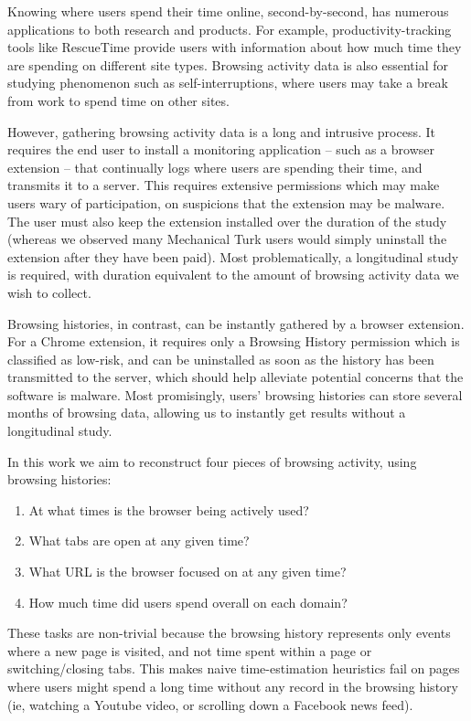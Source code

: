 \documentclass{sigchi}
\begin{document}
Knowing where users spend their time online, second-by-second, has numerous applications to both research and products. For example, productivity-tracking tools like RescueTime provide users with information about how much time they are spending on different site types. Browsing activity data is also essential for studying phenomenon such as self-interruptions, where users may take a break from work to spend time on other sites.

However, gathering browsing activity data is a long and intrusive process. It requires the end user to install a monitoring application -- such as a browser extension -- that continually logs where users are spending their time, and transmits it to a server. This requires extensive permissions which may make users wary of participation, on suspicions that the extension may be malware. The user must also keep the extension installed over the duration of the study (whereas we observed many Mechanical Turk users would simply uninstall the extension after they have been paid). Most problematically, a longitudinal study is required, with duration equivalent to the amount of browsing activity data we wish to collect.

Browsing histories, in contrast, can be instantly gathered by a browser extension. For a Chrome extension, it requires only a Browsing History permission which is classified as low-risk, and can be uninstalled as soon as the history has been transmitted to the server, which should help alleviate potential concerns that the software is malware. Most promisingly, users' browsing histories can store several months of browsing data, allowing us to instantly get results without a longitudinal study.

In this work we aim to reconstruct four pieces of browsing activity, using browsing histories:

\begin{enumerate}
	\item At what times is the browser being actively used?
	\item What tabs are open at any given time?
	\item What URL is the browser focused on at any given time?
	\item How much time did users spend overall on each domain?
\end{enumerate}

These tasks are non-trivial because the browsing history represents only events where a new page is visited, and not time spent within a page or switching/closing tabs. This makes naive time-estimation heuristics fail on pages where users might spend a long time without any record in the browsing history (ie, watching a Youtube video, or scrolling down a Facebook news feed).
\end{document}
